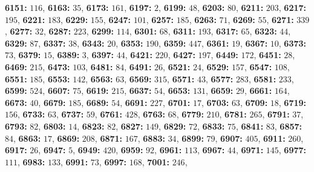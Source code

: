 \textsf{\bfseries 6151:} $116$, \textsf{\bfseries 6163:} $35$, \textsf{\bfseries 6173:} $161$, \textsf{\bfseries 6197:} $2$, \textsf{\bfseries 6199:} $48$, \textsf{\bfseries 6203:} $80$, \textsf{\bfseries 6211:} $203$, \textsf{\bfseries 6217:} $195$, \textsf{\bfseries 6221:} $183$, \textsf{\bfseries 6229:} $155$, \textsf{\bfseries 6247:} $101$, \textsf{\bfseries 6257:} $185$, \textsf{\bfseries 6263:} $71$, \textsf{\bfseries 6269:} $55$, \textsf{\bfseries 6271:} $339$, \textsf{\bfseries 6277:} $32$, \textsf{\bfseries 6287:} $223$, \textsf{\bfseries 6299:} $114$, \textsf{\bfseries 6301:} $68$, \textsf{\bfseries 6311:} $193$, \textsf{\bfseries 6317:} $65$, \textsf{\bfseries 6323:} $44$, \textsf{\bfseries 6329:} $87$, \textsf{\bfseries 6337:} $38$, \textsf{\bfseries 6343:} $20$, \textsf{\bfseries 6353:} $190$, \textsf{\bfseries 6359:} $447$, \textsf{\bfseries 6361:} $19$, \textsf{\bfseries 6367:} $10$, \textsf{\bfseries 6373:} $73$, \textsf{\bfseries 6379:} $15$, \textsf{\bfseries 6389:} $3$, \textsf{\bfseries 6397:} $44$, \textsf{\bfseries 6421:} $220$, \textsf{\bfseries 6427:} $197$, \textsf{\bfseries 6449:} $172$, \textsf{\bfseries 6451:} $28$, \textsf{\bfseries 6469:} $215$, \textsf{\bfseries 6473:} $103$, \textsf{\bfseries 6481:} $84$, \textsf{\bfseries 6491:} $26$, \textsf{\bfseries 6521:} $24$, \textsf{\bfseries 6529:} $157$, \textsf{\bfseries 6547:} $108$, \textsf{\bfseries 6551:} $185$, \textsf{\bfseries 6553:} $142$, \textsf{\bfseries 6563:} $63$, \textsf{\bfseries 6569:} $315$, \textsf{\bfseries 6571:} $43$, \textsf{\bfseries 6577:} $283$, \textsf{\bfseries 6581:} $233$, \textsf{\bfseries 6599:} $524$, \textsf{\bfseries 6607:} $75$, \textsf{\bfseries 6619:} $215$, \textsf{\bfseries 6637:} $54$, \textsf{\bfseries 6653:} $131$, \textsf{\bfseries 6659:} $29$, \textsf{\bfseries 6661:} $164$, \textsf{\bfseries 6673:} $40$, \textsf{\bfseries 6679:} $185$, \textsf{\bfseries 6689:} $54$, \textsf{\bfseries 6691:} $227$, \textsf{\bfseries 6701:} $17$, \textsf{\bfseries 6703:} $63$, \textsf{\bfseries 6709:} $18$, \textsf{\bfseries 6719:} $156$, \textsf{\bfseries 6733:} $63$, \textsf{\bfseries 6737:} $59$, \textsf{\bfseries 6761:} $428$, \textsf{\bfseries 6763:} $68$, \textsf{\bfseries 6779:} $210$, \textsf{\bfseries 6781:} $265$, \textsf{\bfseries 6791:} $37$, \textsf{\bfseries 6793:} $82$, \textsf{\bfseries 6803:} $14$, \textsf{\bfseries 6823:} $82$, \textsf{\bfseries 6827:} $149$, \textsf{\bfseries 6829:} $72$, \textsf{\bfseries 6833:} $75$, \textsf{\bfseries 6841:} $83$, \textsf{\bfseries 6857:} $84$, \textsf{\bfseries 6863:} $17$, \textsf{\bfseries 6869:} $208$, \textsf{\bfseries 6871:} $167$, \textsf{\bfseries 6883:} $34$, \textsf{\bfseries 6899:} $79$, \textsf{\bfseries 6907:} $405$, \textsf{\bfseries 6911:} $260$, \textsf{\bfseries 6917:} $26$, \textsf{\bfseries 6947:} $5$, \textsf{\bfseries 6949:} $420$, \textsf{\bfseries 6959:} $92$, \textsf{\bfseries 6961:} $113$, \textsf{\bfseries 6967:} $44$, \textsf{\bfseries 6971:} $145$, \textsf{\bfseries 6977:} $111$, \textsf{\bfseries 6983:} $133$, \textsf{\bfseries 6991:} $73$, \textsf{\bfseries 6997:} $168$, \textsf{\bfseries 7001:} $246$, 
